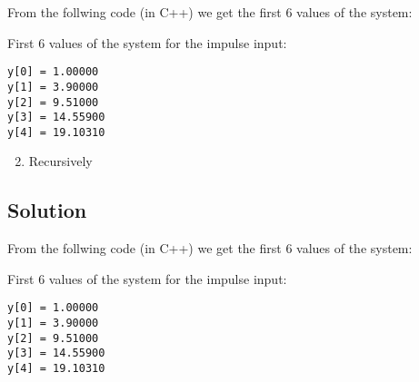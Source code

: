 From the follwing code (in C++) we get the first 6 values of the system:

First 6 values of the system for the impulse input:
\begin{verbatim}
y[0] = 1.00000
y[1] = 3.90000
y[2] = 9.51000
y[3] = 14.55900
y[4] = 19.10310
\end{verbatim}

\begin{enumerate}
\setcounter{enumi}{1}
\item Recursively
\end{enumerate} 

\subsection*{Solution}
From the follwing code (in C++) we get the first 6 values of the system:

First 6 values of the system for the impulse input:
\begin{verbatim}
y[0] = 1.00000
y[1] = 3.90000
y[2] = 9.51000
y[3] = 14.55900
y[4] = 19.10310
\end{verbatim}

